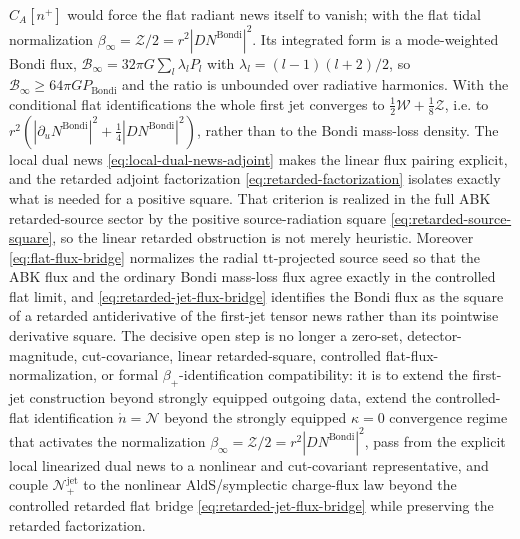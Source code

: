 \documentclass[11pt,a4paper]{article}
\newcommand{\cN}{\mathcal{N}}
\begin{document}
\(C_A[n^+]\) would force the flat radiant news itself to vanish; with the flat tidal normalization \(\beta_\infty=\mathcal Z/2=r^2|D N^{\mathrm{Bondi}}|^2\).  Its integrated form is a mode-weighted Bondi flux, \(\mathcal B_\infty=32\pi G\sum_l\lambda_lP_l\) with \(\lambda_l=(l-1)(l+2)/2\), so \(\mathcal B_\infty\ge64\pi GP_{\mathrm{Bondi}}\) and the ratio is unbounded over radiative harmonics.  With the conditional flat identifications the whole first jet converges to \(\tfrac12\mathcal W+\tfrac18\mathcal Z\), i.e. to \(r^2(|\partial_uN^{\mathrm{Bondi}}|^2+\tfrac14|DN^{\mathrm{Bondi}}|^2)\), rather than to the Bondi mass-loss density.  The local dual news \eqref{eq:local-dual-news-adjoint} makes the linear flux pairing explicit, and the retarded adjoint factorization \eqref{eq:retarded-factorization} isolates exactly what is needed for a positive square.  That criterion is realized in the full ABK retarded-source sector by the positive source-radiation square \eqref{eq:retarded-source-square}, so the linear retarded obstruction is not merely heuristic.  Moreover \eqref{eq:flat-flux-bridge} normalizes the radial \(\mathrm{tt}\)-projected source seed so that the ABK flux and the ordinary Bondi mass-loss flux agree exactly in the controlled flat limit, and \eqref{eq:retarded-jet-flux-bridge} identifies the Bondi flux as the square of a retarded antiderivative of the first-jet tensor news rather than its pointwise derivative square.  The decisive open step is no longer a zero-set, detector-magnitude, cut-covariance, linear retarded-square, controlled flat-flux-normalization, or formal \(\beta_+\)-identification compatibility: it is to extend the first-jet construction beyond strongly equipped outgoing data, extend the controlled-flat identification \(\mathring n=\mathcal N\) beyond the strongly equipped \(\kappa=0\) convergence regime that activates the normalization \(\beta_\infty=\mathcal Z/2=r^2|D N^{\mathrm{Bondi}}|^2\), pass from the explicit local linearized dual news to a nonlinear and cut-covariant representative, and couple \(\cN^{\mathrm{jet}}_+\) to the nonlinear AldS/symplectic charge-flux law beyond the controlled retarded flat bridge \eqref{eq:retarded-jet-flux-bridge} while preserving the retarded factorization.



\end{document}
